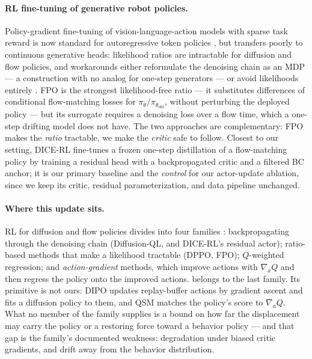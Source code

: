 
\paragraph{RL fine-tuning of generative robot policies.}
Policy-gradient fine-tuning of vision-language-action models with sparse task
reward is now standard for autoregressive token policies
\citep{simplevlarl}, but transfers poorly to continuous generative heads:
likelihood ratios are intractable for diffusion and flow policies, and
workarounds either reformulate the denoising chain as an MDP
\citep{ren2024dppo,black2023ddpo} --- a construction with no analog for
one-step generators --- or avoid likelihoods entirely
\citep{park2025fql,reinflow2025,parl2024}. FPO \citep{mcallister2025flowmatchingpolicygradients} is the strongest
likelihood-free ratio --- it substitutes differences of conditional
flow-matching losses for $\pi_\theta/\pi_{\theta_{\text{old}}}$, without
perturbing the deployed policy --- but its surrogate requires a denoising
loss over a flow time, which a one-step drifting model does not have. The
two approaches are complementary: FPO makes the \emph{ratio} tractable, we
make the \emph{critic} safe to follow. Closest to our setting, DICE-RL
\citep{dicerl2026} fine-tunes a frozen one-step distillation of a
flow-matching policy by training a residual head with a backpropagated
critic and a filtered BC anchor; it is our primary baseline and the
\emph{control} for our actor-update ablation, since we keep its critic,
residual parameterization, and data pipeline unchanged.

\paragraph{Where this update sits.}
RL for diffusion and flow policies divides into four families
\citep{dprlsurvey2026}: backpropagating through the denoising chain
(Diffusion-QL, and DICE-RL's residual actor); ratio-based methods that make
a likelihood tractable (DPPO, FPO); $Q$-weighted regression; and
\emph{action-gradient} methods, which improve actions with $\nabla_a Q$ and
then regress the policy onto the improved actions. \method{} belongs to the last family. Its primitive is not ours: DIPO
\citep{dipo2024} updates replay-buffer actions by gradient ascent and fits a
diffusion policy to them, and QSM \citep{psenka2024qsm} matches the policy's
score to $\nabla_a Q$. What no member of the family supplies
\citep{dprlsurvey2026} is a bound on how far the displacement may carry the
policy or a restoring force toward a behavior policy --- and that gap is the
family's documented weakness: degradation under biased critic gradients, and
drift away from the behavior distribution.

